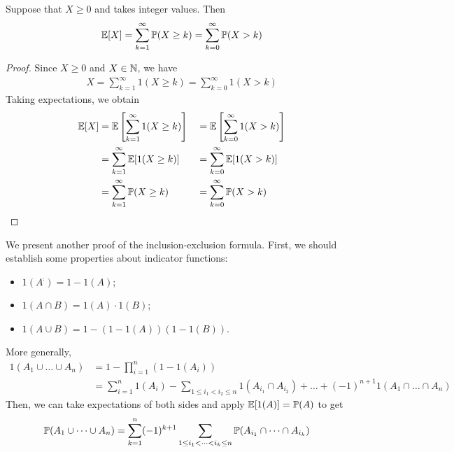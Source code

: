 \documentclass{../../template/note}
\begin{document}
    \begin{proposition}
        Suppose that \(X \geq 0\) and takes integer values. Then
        \begin{align*}
            \mathbb E[X] = \sum_{k=1}^\infty \mathbb P(X \geq k) = \sum_{k=0}^\infty \mathbb P(X > k)
        \end{align*}
    \end{proposition}
    
    \begin{proof}
        Since \(X \geq 0\) and \(X \in \mathbb N\), we have
        \begin{align*}
            X = \sum_{k=1}^\infty 1(X \geq k) = \sum_{k=0}^\infty 1(X > k)
        \end{align*}
        Taking expectations, we obtain
        \begin{align*}
            \mathbb E[X] &= \mathbb E\left[\sum_{k=1}^\infty 1(X \geq k)\right] &&= \mathbb E\left[\sum_{k=0}^\infty 1(X > k)\right] \\
            &= \sum_{k=1}^\infty \mathbb E[1(X \geq k)] &&= \sum_{k=0}^\infty \mathbb E[1(X > k)] \\
            &= \sum_{k=1}^\infty \mathbb P(X \geq k) &&= \sum_{k=0}^\infty \mathbb P(X > k)
        \end{align*}
    \end{proof}
    

    We present another proof of the inclusion-exclusion formula. First, we should establish some properties about indicator functions:
    \begin{itemize}
        \item \(1(A^\comp) = 1 - 1(A)\);
        \item \(1(A \cap B) = 1(A) \cdot 1(B)\);
        \item \(1(A \cup B) = 1 - (1-1(A))(1-1(B))\).
    \end{itemize}
    
    More generally,
    \begin{align*}
        1(A_1 \cup \dots \cup A_n) &= 1 - \prod_{i=1}^n (1-1(A_i)) \\
        &= \sum_{i=1}^n 1(A_i) - \sum_{1 \leq i_1 < i_2 \leq n} 1(A_{i_1} \cap A_{i_2}) + \dots + (-1)^{n+1} 1(A_1 \cap \dots \cap A_n)
    \end{align*}
    Then, we can take expectations of both sides and apply \(\mathbb E[1(A)] = \mathbb P(A)\) to get
    \begin{align*}
        \mathbb P(A_1 \cup \dots \cup A_n) &= \sum_{k=1}^n (-1)^{k+1} \sum_{1 \leq i_1 < \dots < i_k \leq n} \mathbb P(A_{i_1} \cap \dots \cap A_{i_k})
    \end{align*}
    
\end{document}

